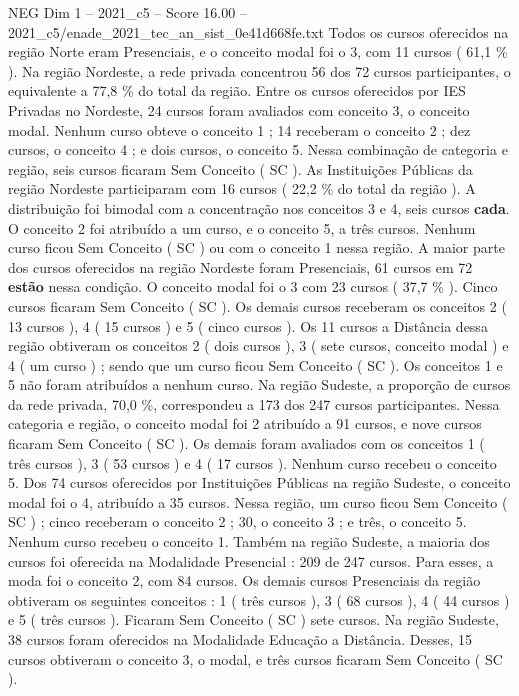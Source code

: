\begin{textsample}{NEG Dim 1 – 2021\_c5 – Score 16.00 – 2021\_c5/enade\_2021\_tec\_an\_sist\_0e41d668fe.txt}
Todos os cursos oferecidos na região Norte eram Presenciais, e o conceito modal foi o 3, com 11 cursos ( 61,1 \% ).
Na região Nordeste, a rede privada concentrou 56 dos 72 cursos participantes, o equivalente a 77,8 \% do total da região.
Entre os cursos oferecidos por IES Privadas no Nordeste, 24 cursos foram avaliados com conceito 3, o conceito modal.
Nenhum curso obteve o conceito 1 ; 14 receberam o conceito 2 ; dez cursos, o conceito 4 ; e dois cursos, o conceito 5.
Nessa combinação de categoria e região, seis cursos ficaram Sem Conceito ( SC ).
As Instituições Públicas da região Nordeste participaram com 16 cursos ( 22,2 \% do total da região ).
A distribuição foi bimodal com a concentração nos conceitos 3 e 4, seis cursos \textbf{cada}.
O conceito 2 foi atribuído a um curso, e o conceito 5, a três cursos.
Nenhum curso ficou Sem Conceito ( SC ) ou com o conceito 1 nessa região.
A maior parte dos cursos oferecidos na região Nordeste foram Presenciais, 61 cursos em 72 \textbf{estão} nessa condição.
O conceito modal foi o 3 com 23 cursos ( 37,7 \% ).
Cinco cursos ficaram Sem Conceito ( SC ).
Os demais cursos receberam os conceitos 2 ( 13 cursos ), 4 ( 15 cursos ) e 5 ( cinco cursos ).
Os 11 cursos a Distância dessa região obtiveram os conceitos 2 ( dois cursos ), 3 ( sete cursos, conceito modal ) e 4 ( um curso ) ; sendo que um curso ficou Sem Conceito ( SC ).
Os conceitos 1 e 5 não foram atribuídos a nenhum curso.
Na região Sudeste, a proporção de cursos da rede privada, 70,0 \%, correspondeu a 173 dos 247 cursos participantes.
Nessa categoria e região, o conceito modal foi 2 atribuído a 91 cursos, e nove cursos ficaram Sem Conceito ( SC ).
Os demais foram avaliados com os conceitos 1 ( três cursos ), 3 ( 53 cursos ) e 4 ( 17 cursos ).
Nenhum curso recebeu o conceito 5.
Dos 74 cursos oferecidos por Instituições Públicas na região Sudeste, o conceito modal foi o 4, atribuído a 35 cursos.
Nessa região, um curso ficou Sem Conceito ( SC ) ; cinco receberam o conceito 2 ; 30, o conceito 3 ; e três, o conceito 5.
Nenhum curso recebeu o conceito 1.
Também na região Sudeste, a maioria dos cursos foi oferecida na Modalidade Presencial : 209 de 247 cursos.
Para esses, a moda foi o conceito 2, com 84 cursos.
Os demais cursos Presenciais da região obtiveram os seguintes conceitos : 1 ( três cursos ), 3 ( 68 cursos ), 4 ( 44 cursos ) e 5 ( três cursos ).
Ficaram Sem Conceito ( SC ) sete cursos.
Na região Sudeste, 38 cursos foram oferecidos na Modalidade Educação a Distância.
Desses, 15 cursos obtiveram o conceito 3, o modal, e três cursos ficaram Sem Conceito ( SC ).

\end{textsample}
